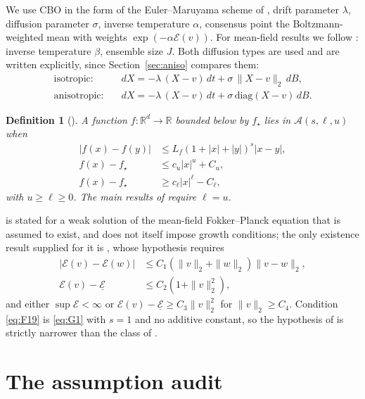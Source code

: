 \documentclass[pdflatex,sn-mathphys-num]{sn-jnl}
\theoremstyle{thmstyleone}
\theoremstyle{thmstyletwo}
\theoremstyle{thmstylethree}
\newtheorem{definition}{Definition}
\begin{document}
We use CBO in the form of the Euler--Maruyama scheme of \cite{fkr2024}, drift parameter $\lambda$, diffusion parameter $\sigma$, inverse temperature $\alpha$, consensus point the Boltzmann-weighted mean with weights $\exp(-\alpha\mathcal E(v))$. For mean-field results we follow \cite{ghv2025}: inverse temperature $\beta$, ensemble size $J$. Both diffusion types are used and are written explicitly, since Section~\ref{sec:aniso} compares them:
\begin{align}
\text{isotropic:}\quad & dX=-\lambda\,(X-v)\,dt+\sigma\,\|X-v\|_2\,dB,\label{eq:iso}\\
\text{anisotropic:}\quad & dX=-\lambda\,(X-v)\,dt+\sigma\,\mathrm{diag}(X-v)\,dB.\label{eq:aniso}
\end{align}

\begin{definition}[{\cite[Assumption H]{ghv2025}}]\label{def:AH}
A function $f:\mathbb R^d\to\mathbb R$ bounded below by $f_\star$ lies in $\mathcal A(s,\ell,u)$ when
\begin{align}
|f(x)-f(y)|&\le L_f(1+|x|+|y|)^s|x-y|,\label{eq:G1}\\
f(x)-f_\star&\le c_u|x|^u+C_u,\label{eq:G2a}\\
f(x)-f_\star&\ge c_\ell|x|^\ell-C_\ell,\label{eq:G2b}
\end{align}
with $u\ge\ell\ge0$. The main results of \cite{ghv2025} require $\ell=u$.
\end{definition}

\cite[Theorem 3.7]{fkr2024} is stated for a weak solution of the mean-field Fokker--Planck equation that is assumed to exist, and does not itself impose growth conditions; the only existence result supplied for it is \cite[Theorem 3.2]{fkr2024}, whose hypothesis requires
\begin{align}
|\mathcal E(v)-\mathcal E(w)|&\le C_1(\|v\|_2+\|w\|_2)\|v-w\|_2,\label{eq:F19}\\
\mathcal E(v)-\underline{\mathcal E}&\le C_2(1+\|v\|_2^2),\label{eq:F20}
\end{align}
and either $\sup\mathcal E<\infty$ or $\mathcal E(v)-\underline{\mathcal E}\ge C_3\|v\|_2^2$ for $\|v\|_2\ge C_4$. Condition \eqref{eq:F19} is \eqref{eq:G1} with $s=1$ and no additive constant, so the hypothesis of \cite{fkr2024} is strictly narrower than the class of \cite{ghv2025}.

\section{The assumption audit}\label{sec3}
\end{document}
